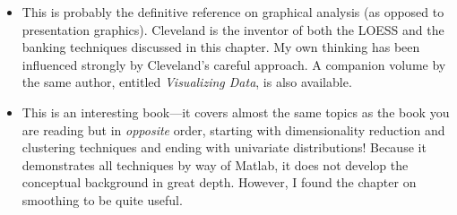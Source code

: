 \begin{itemize}

\item {}
  This is probably the definitive reference on graphical analysis (as
  opposed to presentation graphics). Cleveland is the inventor of both
  the LOESS and the banking techniques discussed in this chapter. My
  own thinking has been influenced strongly by Cleveland's careful
  approach.  A companion volume by the same author, entitled
  \emph{Visualizing Data}, is also available.
\item {}
  This is an interesting book---it covers almost the same topics as
  the book you are reading but in \emph{opposite} order, starting with
  dimensionality reduction and clustering techniques and ending with
  univariate distributions! Because it demonstrates all techniques by
  way of Matlab, it does not develop the conceptual background in
  great depth. However, I found the chapter on smoothing to be quite
  useful.
\end{itemize}

